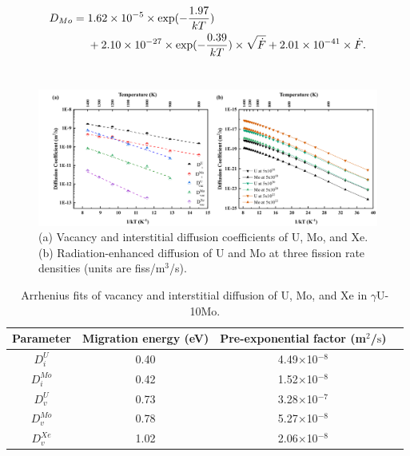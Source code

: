 \documentclass[preprint,12pt]{elsarticle}
\begin{document}
\begin{align} 
D_{Mo}={}& 1.62\times10^{-5}\times \mbox{exp}(-\frac{1.97}{kT})\\ 
&+2.10\times10^{-27}\times \mbox{exp}(-\frac{0.39}{kT})\times \sqrt{\dot{F}} + 2.01\times10^{-41}\times \dot{F}. \notag
\end{align}
\\
\begin{figure}[hbt!]
\centering
\includegraphics[width=1\textwidth]{Fig4.png}
\caption{(a) Vacancy and interstitial diffusion coefficients of U, Mo, and Xe. (b) Radiation-enhanced diffusion of U and Mo at three fission rate densities (units are fiss/m$^{3}$/s).}
\label{fig:diffcoefficient1}
\end{figure}

\begin{table}[hbt!]
\captionsetup{font=normalsize} 
\caption{Arrhenius fits of vacancy and interstitial diffusion of U, Mo, and Xe in $\gamma$U-10Mo.}
\renewcommand{\arraystretch}{1.2}
\begin{center}
\begin{tabular}{cccc}
\hline
Parameter & Migration energy (eV) & Pre-exponential factor (m$^{2}$/$\mathrm{s}$)  \\ 
\hline
$D^{U}_{i}$ & 0.40 & 4.49$\times$10$^{-8}$ \\  
$D^{Mo}_{i}$& 0.42 & 1.52$\times$10$^{-8}$ \\
$D^{U}_{v}$ & 0.73  & 3.28$\times$10$^{-7}$ \\ 
$D^{Mo}_{v}$& 0.78 & 5.27$\times$10$^{-8}$ \\
$D^{Xe}_{v}$& 1.02 & 2.06$\times$10$^{-8}$ \\
\hline
\end{tabular}
\end{center}
\label{tab:diff1} 
\end{table} 
\end{document}
